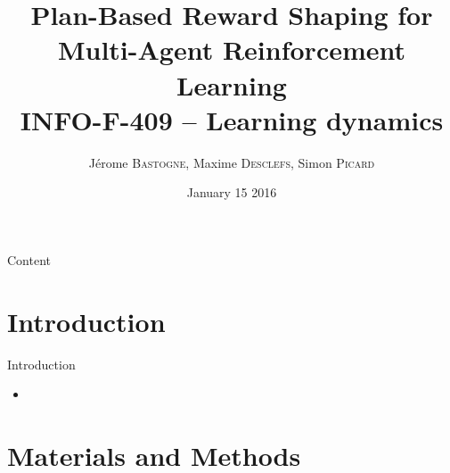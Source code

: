 \documentclass{bredelebeamer}
\begin{document}
\title[PBRS for MARL]{\textbf{Plan-Based Reward Shaping for Multi-Agent Reinforcement Learning} \\INFO-F-409 -- Learning dynamics} %

\author[]{Jérome \textsc{Bastogne}, Maxime \textsc{Desclefs}, Simon \textsc{Picard}}
\date{January 15 2016} %

\begin{frame}
\titlepage %
\end{frame}

\begin{frame}{Content}
\tableofcontents %
\end{frame}

\section{Introduction}
\begin{frame}{Introduction}

\begin{block}{}
\begin{itemize}
\item 
\end{itemize}
\end{block}

\end{frame}

\section{Materials and Methods}
\end{document}
